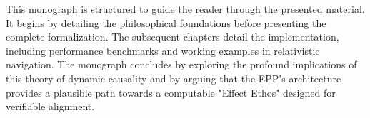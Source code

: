 This monograph is structured to guide the reader through the presented material. It begins by detailing the philosophical foundations 
before presenting the complete formalization. The subsequent chapters detail the implementation, including performance benchmarks 
and working examples in relativistic navigation. The monograph concludes by exploring the profound implications of this theory of dynamic causality 
and by arguing that the EPP's architecture provides a plausible path towards a computable "Effect Ethos" designed for verifiable alignment.

\newpage
